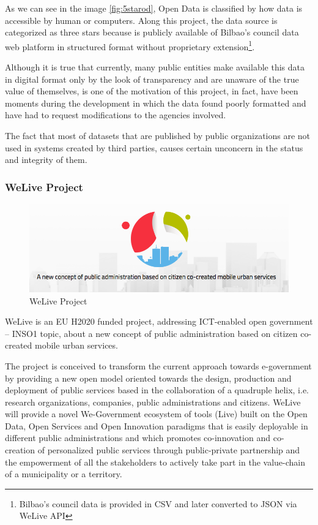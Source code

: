 \documentclass{DeustoFDP}
\begin{document}
As we can see in the image \ref{fig:5starod}, Open Data is classified by how data is accessible by human or computers. Along this project, the data source is categorized as three stars because is publicly available of Bilbao's council data web platform \cite{BilbaoOpenData} in structured format without proprietary extension\footnote{Bilbao's council data is provided in CSV and later converted to JSON via WeLive API}. 

Although it is true that currently, many public entities make available this data in digital format only by the look of transparency and are unaware of the true value of themselves, is one of the motivation of this project, in fact, have been moments during the development in which the data found poorly formatted and have had to request modifications to the agencies involved.

The fact that most of datasets that are published by public organizations are not used in systems created by third parties, causes certain unconcern in the status and integrity of them.

\subsubsection{WeLive Project}
\begin{figure}[h]
\centering
\includegraphics[width=0.7\linewidth]{fig/welive}
\caption[WeLive Project]{WeLive Project}
\label{fig:welive}
\end{figure}


WeLive is an EU H2020 funded project, addressing ICT-enabled open government – INSO1 topic, about a new concept of public administration based on citizen co-created mobile urban services.

The project is conceived to transform the current approach towards e-government by providing a new open model oriented towards the design, production and deployment of public services based in the collaboration of a quadruple helix, i.e. research organizations, companies, public administrations and citizens. WeLive will provide a novel We-Government ecosystem of tools (Live) built on the Open Data, Open Services and Open  Innovation paradigms that is easily deployable in different public administrations and which promotes co-innovation and co-creation of personalized public services through public-private partnership and the  empowerment of all the stakeholders to actively take part in the value-chain of a municipality or a territory. \cite{WeLive}
\end{document}
